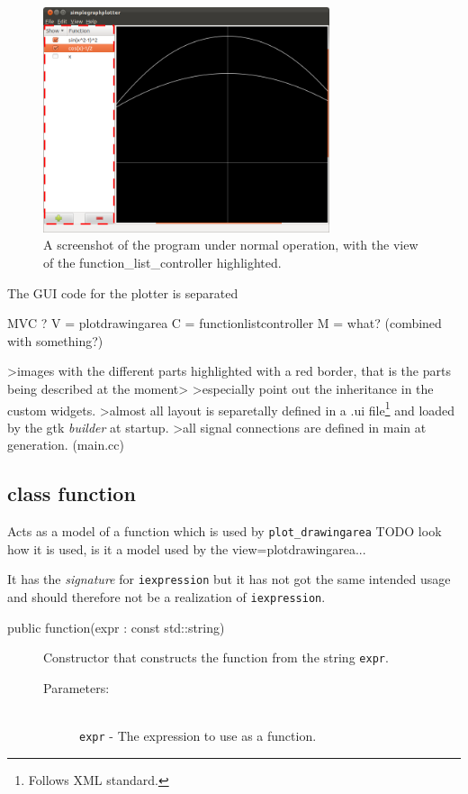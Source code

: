 \documentclass[a4paper,11pt]{kth-mag}
\begin{document}
\begin{figure}[ht]
\begin{center}
    \includegraphics[width=0.75\textwidth]{screenshot00_function_list_controller.png}
    \caption{\small{A screenshot of the program under normal operation, with
    the view of the function\_list\_controller highlighted.}}
   \label{fig:screenshotfunctionlistcontroller}
\end{center}
\end{figure}


The GUI code for the plotter is separated 

MVC ?
V = plotdrawingarea
C = functionlistcontroller
M = what? (combined with something?)

>images with the different parts highlighted with a red border, that is the parts being described at the moment>
>especially point out the inheritance in the custom widgets.
>almost all layout is separetally defined in a .ui file\footnote{Follows XML
standard.} and loaded by the gtk \emph{builder} at startup.
>all signal connections are defined in main at generation. (main.cc)


\subsection{class function}
Acts as a model of a function which is used by \texttt{plot\_drawingarea}
TODO look how it is used, is it a model used by the view=plotdrawingarea...

It has the \emph{signature} for \texttt{iexpression} but it has not got the
same intended usage and should therefore not be a realization of
\texttt{iexpression}.

\begin{description}
    \item[public function(expr : const std::string)] Constructor 
    that constructs the function from the string \texttt{expr}.
    \begin{description}
        \item[Parameters:]~\\
            \verb+expr+ - The expression to use as a function.
    \end{description}
\end{description}
\end{document}
